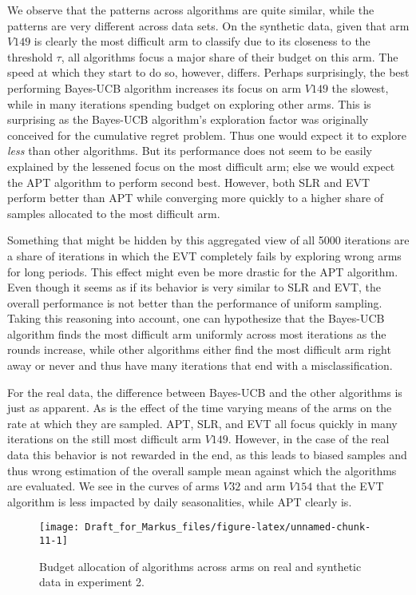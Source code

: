 \documentclass[11pt,]{article}
\begin{document}
We observe that the patterns across algorithms are quite similar, while
the patterns are very different across data sets. On the synthetic data,
given that arm \(V149\) is clearly the most difficult arm to classify
due to its closeness to the threshold \(\tau\), all algorithms focus a
major share of their budget on this arm. The speed at which they start
to do so, however, differs. Perhaps surprisingly, the best performing
Bayes-UCB algorithm increases its focus on arm \(V149\) the slowest,
while in many iterations spending budget on exploring other arms. This
is surprising as the Bayes-UCB algorithm's exploration factor was
originally conceived for the cumulative regret problem. Thus one would
expect it to explore \emph{less} than other algorithms. But its
performance does not seem to be easily explained by the lessened focus
on the most difficult arm; else we would expect the APT algorithm to
perform second best. However, both SLR and EVT perform better than APT
while converging more quickly to a higher share of samples allocated to
the most difficult arm.

Something that might be hidden by this aggregated view of all 5000
iterations are a share of iterations in which the EVT completely fails
by exploring wrong arms for long periods. This effect might even be more
drastic for the APT algorithm. Even though it seems as if its behavior
is very similar to SLR and EVT, the overall performance is not better
than the performance of uniform sampling. Taking this reasoning into
account, one can hypothesize that the Bayes-UCB algorithm finds the most
difficult arm uniformly across most iterations as the rounds increase,
while other algorithms either find the most difficult arm right away or
never and thus have many iterations that end with a misclassification.

For the real data, the difference between Bayes-UCB and the other
algorithms is just as apparent. As is the effect of the time varying
means of the arms on the rate at which they are sampled. APT, SLR, and
EVT all focus quickly in many iterations on the still most difficult arm
\(V149\). However, in the case of the real data this behavior is not
rewarded in the end, as this leads to biased samples and thus wrong
estimation of the overall sample mean against which the algorithms are
evaluated. We see in the curves of arms \(V32\) and arm \(V154\) that
the EVT algorithm is less impacted by daily seasonalities, while APT
clearly is.

\begin{figure}

{\centering \texttt{[image: Draft\_for\_Markus\_files/figure-latex/unnamed-chunk-11-1]} 

}

\caption{Budget allocation of algorithms across arms on real and synthetic data in experiment 2.}\label{fig:unnamed-chunk-11}
\end{figure}
\end{document}

